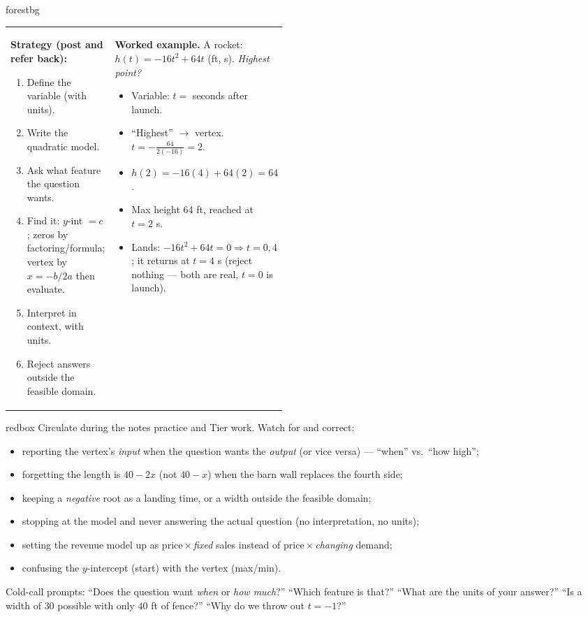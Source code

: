 \documentclass[10pt]{article}
\begin{document}
\begin{skillbox}{forestbg}
\begin{tabularx}{\linewidth}{@{}p{0.46\linewidth} X@{}}
\textbf{Strategy (post and refer back):}
\begin{enumerate}[leftmargin=1.4em, nosep, itemsep=2pt]
  \item Define the variable (with units).
  \item Write the quadratic model.
  \item Ask what feature the question wants.
  \item Find it: $y$-int $=c$; zeros by factoring/formula; vertex by $x=-b/2a$ then evaluate.
  \item Interpret in context, with units.
  \item Reject answers outside the feasible domain.
\end{enumerate}
&
\textbf{Worked example.} A rocket: $h(t)=-16t^2+64t$ (ft, s). \emph{Highest point?}
\begin{itemize}[leftmargin=1.2em, nosep, itemsep=1pt]
  \item Variable: $t=$ seconds after launch.
  \item ``Highest'' $\to$ vertex. $t=-\tfrac{64}{2(-16)}=2$.
  \item $h(2)=-16(4)+64(2)=64$.
  \item Max height $64$ ft, reached at $t=2$ s.
  \item Lands: $-16t^2+64t=0\Rightarrow t=0,4$; it returns at $t=4$ s (reject nothing --- both are real, $t=0$ is launch).
\end{itemize}
\end{tabularx}
\end{skillbox}

\begin{skillbox}{redbox}
Circulate during the notes practice and Tier work. Watch for and correct:
\begin{itemize}[leftmargin=1.2em, nosep]
  \item reporting the vertex's \emph{input} when the question wants the \emph{output} (or vice versa) --- ``when'' vs.\ ``how high'';
  \item forgetting the length is $40-2x$ (not $40-x$) when the barn wall replaces the fourth side;
  \item keeping a \emph{negative} root as a landing time, or a width outside the feasible domain;
  \item stopping at the model and never answering the actual question (no interpretation, no units);
  \item setting the revenue model up as price\,$\times$\,\emph{fixed} sales instead of price\,$\times$\,\emph{changing} demand;
  \item confusing the $y$-intercept (start) with the vertex (max/min).
\end{itemize}
Cold-call prompts: ``Does the question want \emph{when} or \emph{how much}?'' ``Which feature is that?'' ``What are
the units of your answer?'' ``Is a width of $30$ possible with only $40$ ft of fence?'' ``Why do we throw out $t=-1$?''
\end{skillbox}
\end{document}
